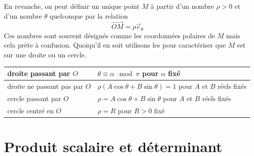 En revanche, on peut définir un unique point $M$ à partir d'un nombre $\rho >0$ et d'un nombre $\theta$ quelconque par la relation
\begin{displaymath}
 \overrightarrow{OM} = \rho \overrightarrow{e}_\theta
\end{displaymath}
Ces nombres sont souvent désignés comme les coordonnées polaires de $M$ mais cela prète à confusion. Quoiqu'il en soit utilisons les pour caractériser que $M$ est sur une droite ou un cercle. 
\begin{center}
\renewcommand{\arraystretch}{1.5}
\begin{tabular}{|l|l|}\hline
droite passant par $O$ & $\theta \equiv \alpha \mod \pi$ pour $\alpha$ fixé\\ \hline
droite ne passant pas par $O$ & $\rho(A\cos \theta + B\sin \theta) = 1$ pour $A$ et $B$ réels fixés\\ \hline
cercle passant par $O$ & $\rho = A\cos \theta + B\sin \theta$ pour $A$ et $B$ réels fixés\\ \hline
cercle centré en $O$ & $\rho = R$ pour $R>0$ fixé \\ \hline
\end{tabular}
\end{center}

\section{Produit scalaire et déterminant}
